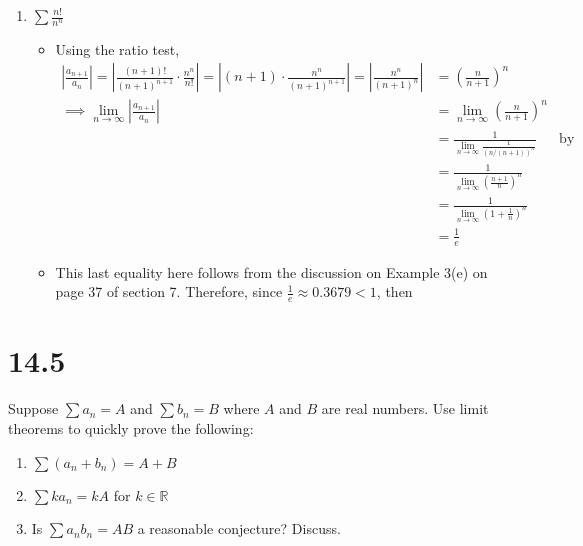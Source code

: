\documentclass[10pt,a4paper]{article}
\theoremstyle{definition}
\begin{document}
\begin{enumerate}[label = (\alph*)]
\begin{itemize}
	\end{itemize}
\item $\displaystyle \sum \frac{n!}{n^n}$
	\begin{itemize}
	\item Using the ratio test,
	\begin{align*}
	\left|\frac{a_{n+1}}{a_n}\right| = \left|\frac{(n + 1)!}{(n+1)^{n+1}} \cdot \frac{n^n}{n!}\right| = \left|(n+1) \cdot \frac{n^n}{(n+1)^{n+1}}\right| = \left|\frac{n^n}{(n+1)^n}\right| &= \left(\frac{n}{n + 1}\right)^n\\
	\implies \lim_{n \to \infty} \left|\frac{a_{n+1}}{a_n}\right| &= \lim_{n \to \infty} \left(\frac{n}{n + 1}\right)^n\\
	&= \frac{1}{\displaystyle \lim_{n \to \infty} \frac{1}{(n/(n+1))^n}} &\text{by Lemma 9.5}\\
	&= \frac{1}{\displaystyle \lim_{n \to \infty} \left( \frac{n + 1}{n}\right)^n}\\
	&= \frac{1}{\displaystyle \lim_{n \to \infty} \left(1 + \frac{1}{n}\right)^n}\\
	&= \frac{1}{e}
	\end{align*}
	\item This last equality here follows from the discussion on Example 3(e) on page 37 of section 7. Therefore, since $\frac{1}{e} \approx 0.3679 < 1$, then 
	\end{itemize}
\end{enumerate}

\section*{14.5}
Suppose $\sum a_n = A$ and $\sum b_n = B$ where $A$ and $B$ are real numbers. Use limit theorems to quickly prove the following:
\begin{enumerate}[label = (\alph*)]
\item $\displaystyle \sum(a_n + b_n) = A + B$
\item $\displaystyle \sum k a_n = kA$ for $k \in \mathbb{R}$
\item Is $\displaystyle \sum a_nb_n = AB$ a reasonable conjecture? Discuss.
\end{enumerate}
\end{document}
